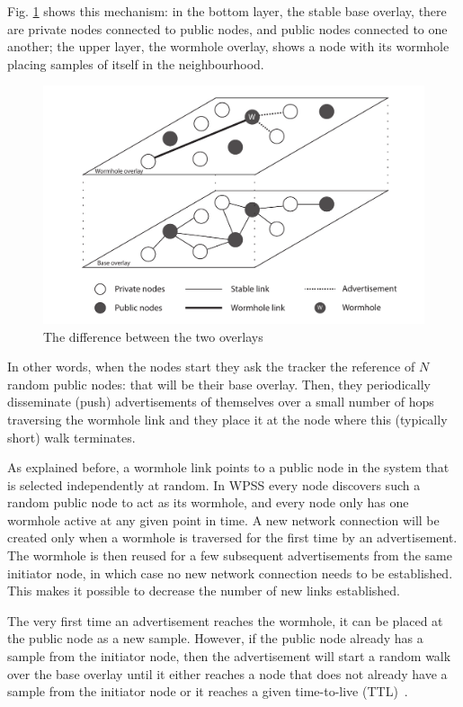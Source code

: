 Fig. \ref{fig:overlay} shows this mechanism: in the bottom layer, the stable base overlay, there are private nodes connected to public nodes, and public nodes connected to one another; the upper layer, the wormhole overlay, shows a node with its wormhole placing samples of itself in the neighbourhood.

\begin{figure}[ht]
  \centering
  \includegraphics[keepaspectratio=true, width=\textwidth]{images/overlay.pdf}\caption{The difference between the two overlays}
  \label{fig:overlay}
\end{figure}

In other words, when the nodes start they ask the tracker the reference of $N$ random public nodes: that will be their base overlay. Then, they periodically disseminate (push) advertisements of themselves over a small number of hops traversing the wormhole link and they place it at the node where this (typically short) walk terminates.

As explained before, a wormhole link points to a public node in the system that is selected independently at random. In WPSS every node discovers such a random public node to act as its wormhole, and every node only has one wormhole active at any given point in time. A new network connection will be created only when a wormhole is traversed for the first time by an advertisement. The wormhole is then reused for a few subsequent advertisements from the same initiator node, in which case no new network connection needs to be established. This makes it possible to decrease the number of new links established.

The very first time an advertisement reaches the wormhole, it can be placed at the public node as a new sample. However, if the public node already has a sample from the initiator node, then the advertisement will start a random walk over the base overlay until it either reaches a node that does not already have a sample from the initiator node or it reaches a given time-to-live (TTL)~\cite{wormhole}.

